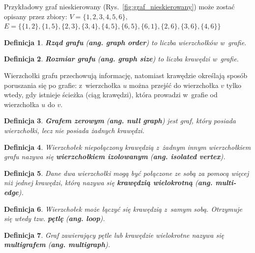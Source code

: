 \documentclass[twoside,12pt]{report}
\newtheorem{definition}{Definicja} %
\begin{document}
Przykładowy graf nieskierowany (Rys.~\ref{fig:graf_nieskierowany}) może zostać opisany przez zbiory:
\newline
\begin{math}
V=\{1,2,3,4,5,6\},
\end{math}
\newline
\begin{math}
E=\{\{1,2\},\{1,5\},\{2,3\},\{3,4\},\{4,5\},\{6,5\},\{6,1\},\{2,6\},\{3,6\},\{4,6\}\}
\end{math}

\begin{definition}
\textbf{Rząd grafu} (\textbf{ang. graph order}) to liczba wierzchołków w~grafie.
\end{definition}

\begin{definition}
\textbf{Rozmiar grafu} (\textbf{ang. graph size}) to liczba krawędzi w~grafie.
\end{definition}

Wierzchołki grafu przechowują informację, natomiast krawędzie określają sposób poruszania się po grafie: z~wierzchołka $u$ można przejść do wierzchołka $v$ tylko wtedy, gdy istnieje ścieżka (ciąg krawędzi), która prowadzi w~grafie od wierzchołka $u$ do $v$.

\begin{definition}
\textbf{Grafem zerowym} (\textbf{ang. null graph}) jest graf, który posiada wierzchołki, lecz nie posiada żadnych krawędzi.
\end{definition}

\begin{definition}
Wierzchołek niepołączony krawędzią z~żadnym innym wierzchołkiem grafu nazywa się \textbf{wierzchołkiem izolowanym} (\textbf{ang. isolated vertex}).
\end{definition}

\begin{definition}
Dane dwa wierzchołki mogą być połączone ze sobą za pomocą więcej niż jednej krawędzi, którą nazywa się \textbf{krawędzią wielokrotną} (\textbf{ang. multi-edge}).
\end{definition}

\begin{definition}
Wierzchołek może łączyć się krawędzią z~samym sobą. Otrzymuje się wtedy tzw. \textbf{pętlę} (\textbf{ang. loop}). 
\end{definition}

\begin{definition}
Graf zawierający pętle lub krawędzie wielokrotne nazywa się \textbf{multigrafem} (\textbf{ang. multigraph}).
\end{definition}
\end{document}
